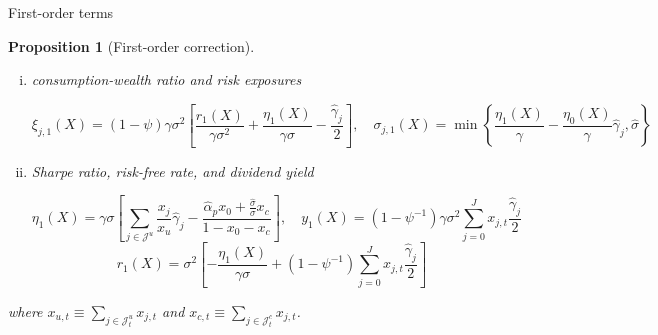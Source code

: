 \documentclass[12pt,aspectratio=169]{beamer}
\providecommand{\propositionname}{Proposition}
\newtheorem{prop}{\protect\propositionname}
\providecommand{\propositionname}{Proposition}
\begin{document}
\begin{frame}{First-order terms}\label{first-order}
    \begin{prop}[First-order correction]
        \begin{enumerate}[(i)]
            \item consumption-wealth ratio and risk exposures
            \begin{footnotesize}
                \[\xi_{j,1}(X)=(1-\psi)\gamma\sigma^2    \left[\frac{r_1(X)}{\gamma\sigma^2}+\frac{\eta_1(X)}{\gamma\sigma}-\frac{\hat{\gamma}_j}{2}\right],\quad
                \sigma_{j,1}(X)=\min\left\lbrace\frac{\eta_1(X)}{\gamma}-\frac{\eta_0(X)}{\gamma}\hat{\gamma}_j,\hat{\sigma}\right\rbrace\]
            \end{footnotesize}
            \item Sharpe ratio, risk-free rate, and dividend yield
            \begin{footnotesize}
                \[\eta_1(X)=\gamma\sigma\left[\sum_{j \in \mathcal{J}^{u}} \frac{x_{j}}{x_{u}} \hat{\gamma}_{j}-\frac{\hat{\alpha}_{p} x_{0}+\frac{\hat{\sigma}}{\sigma} x_{c}}{1-x_{0}-x_{c}}\right],\quad
                y_1(X)=\left(1-\psi^{-1}\right)\gamma\sigma^2\sum_{j=0}^Jx_{j,t}\frac{\hat{\gamma}_j}{2}\]
                \[r_1(X)=\sigma^{2}\left[-\frac{\eta_{1}(X)}{\gamma \sigma}+\left(1-\psi^{-1}\right) \sum_{j=0}^{J} x_{j, t} \frac{\hat{\gamma}_{j}}{2}\right]\]
            \end{footnotesize}
        \end{enumerate}
        where $x_{u,t}\equiv\sum_{j\in\mathcal{J}^u_t}x_{j,t}$ and $x_{c,t}\equiv\sum_{j\in\mathcal{J}^c_t}x_{j,t}$.
        \qquad\qquad\qquad\qquad\hyperlink{second_order}{}
    \end{prop}
\end{frame}
\end{document}
